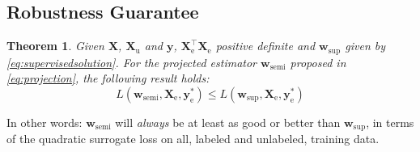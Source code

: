 \documentclass[sts,preprint]{imsart-custom}
\newcommand{\Xe}{\vec{X}_\mathrm{e}  }
\newtheorem{theorem}{Theorem}
\renewcommand{\vec}[1]{\mathbf{#1}}
\begin{document}
\subsection{Robustness Guarantee}
\begin{theorem}
\label{th:robustness}
Given $\vec{X}$, $\vec{X}_\mathrm{u}$ and $\vec{y}$, $\Xe^\top \Xe$ positive definite and $\vec{w}_\mathrm{sup}$ given by \eqref{eq:supervisedsolution}. For the projected estimator $\vec{w}_\mathrm{semi}$ proposed in \eqref{eq:projection}, the following result holds:
$$L(\vec{w}_\mathrm{semi},\Xe,\vec{y}_\mathrm{e}^{\ast}) \leq L(\vec{w}_\mathrm{sup},\Xe,\vec{y}_\mathrm{e}^{\ast}) $$
\end{theorem}
In other words: $\vec{w}_\text{semi}$ will \emph{always} be at least as good or better than $\vec{w}_\text{sup}$, in terms of the quadratic surrogate loss on all, labeled and unlabeled, training data.
\end{document}
